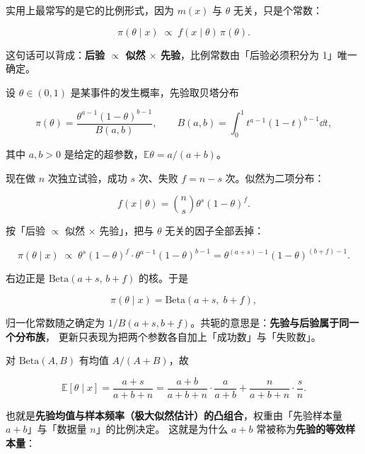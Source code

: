 \documentclass[11pt]{ctexart}
\begin{document}
实用上最常写的是它的比例形式，因为 $m(x)$ 与 $\theta$ 无关，只是个常数：

\[
\pi(\theta\mid x)\;\propto\; f(x\mid\theta)\,\pi(\theta) .
\]

这句话可以背成：\textbf{后验 $\propto$ 似然 $\times$ 先验}，比例常数由「后验必须积分为 1」唯一确定。


设 $\theta\in(0,1)$ 是某事件的发生概率，先验取贝塔分布

\[
\pi(\theta)=\frac{\theta^{a-1}(1-\theta)^{b-1}}{B(a,b)},\qquad
B(a,b)=\int_{0}^{1}t^{a-1}(1-t)^{b-1}\dd t ,
\]

其中 $a,b>0$ 是给定的超参数，$\mathbb{E}\theta=a/(a+b)$。

现在做 $n$ 次独立试验，成功 $s$ 次、失败 $f=n-s$ 次。似然为二项分布：

\[
f(x\mid\theta)=\binom{n}{s}\theta^{s}(1-\theta)^{f} .
\]

按「后验 $\propto$ 似然 $\times$ 先验」，把与 $\theta$ 无关的因子全部丢掉：

\[
\pi(\theta\mid x)\;\propto\;\theta^{s}(1-\theta)^{f}\cdot\theta^{a-1}(1-\theta)^{b-1}
=\theta^{(a+s)-1}(1-\theta)^{(b+f)-1} .
\]

右边正是 $\mathrm{Beta}(a+s,\,b+f)$ 的核。于是

\[
\pi(\theta\mid x)=\mathrm{Beta}(a+s,\;b+f),
\]

归一化常数随之确定为 $1/B(a+s,b+f)$。共轭的意思是：\textbf{先验与后验属于同一个分布族}，
更新只表现为把两个参数各自加上「成功数」与「失败数」。


对 $\mathrm{Beta}(A,B)$ 有均值 $A/(A+B)$，故

\[
\mathbb{E}[\theta\mid x]=\frac{a+s}{a+b+n}
=\frac{a+b}{a+b+n}\cdot\frac{a}{a+b}+\frac{n}{a+b+n}\cdot\frac{s}{n} .
\]

也就是\textbf{先验均值与样本频率（极大似然估计）的凸组合}，权重由「先验样本量 $a+b$」与「数据量 $n$」的比例决定。
这就是为什么 $a+b$ 常被称为\textbf{先验的等效样本量}：


\end{document}
